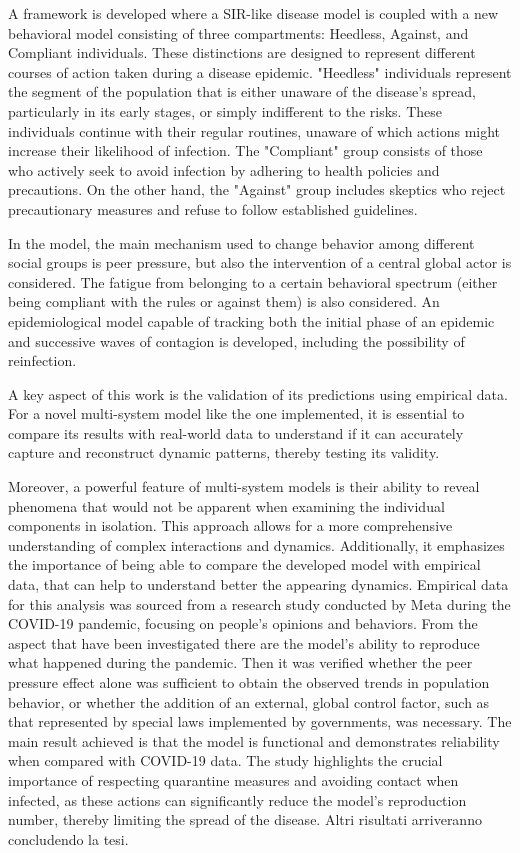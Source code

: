 A framework is developed where a SIR-like disease model is coupled with a new behavioral model consisting of three compartments: Heedless, Against, and Compliant individuals. These distinctions are designed to represent different courses of action taken during a disease epidemic.
"Heedless" individuals represent the segment of the population that is either unaware of the disease’s spread, particularly in its early stages, or simply indifferent to the risks. These individuals continue with their regular routines, unaware of which actions might increase their likelihood of infection.
The "Compliant" group consists of those who actively seek to avoid infection by adhering to health policies and precautions. On the other hand, the "Against" group includes skeptics who reject precautionary measures and refuse to follow established guidelines.

In the model, the main mechanism used to change behavior among different social groups is peer pressure, but also the intervention of a central global actor is considered. The fatigue from belonging to a certain behavioral spectrum (either being compliant with the rules or against them) is also considered. An epidemiological model capable of tracking both the initial phase of an epidemic and successive waves of contagion is developed, including the possibility of reinfection.

A key aspect of this work is the validation of its predictions using empirical data. For a novel multi-system model like the one implemented, it is essential to compare its results with real-world data to understand if it can accurately capture and reconstruct dynamic patterns, thereby testing its validity.

Moreover, a powerful feature of multi-system models is their ability to reveal phenomena that would not be apparent when examining the individual components in isolation. This approach allows for a more comprehensive understanding of complex interactions and dynamics. Additionally, it emphasizes the importance of being able to compare the developed model with empirical data, that can help to understand better the appearing dynamics. Empirical data for this analysis was sourced from a research study conducted by Meta during the COVID-19 pandemic, focusing on people's opinions and behaviors.
From the aspect that have been investigated there are the model's ability to reproduce what happened during the pandemic. Then it was verified whether the peer pressure effect alone was sufficient to obtain the observed trends in population behavior, or whether the addition of an external, global control factor, such as that represented by special laws implemented by governments, was necessary.
The main result achieved is that the model is functional and demonstrates reliability when compared with COVID-19 data. The study highlights the crucial importance of respecting quarantine measures and avoiding contact when infected, as these actions can significantly reduce the model's reproduction number, thereby limiting the spread of the disease. Altri risultati arriveranno concludendo la tesi.

